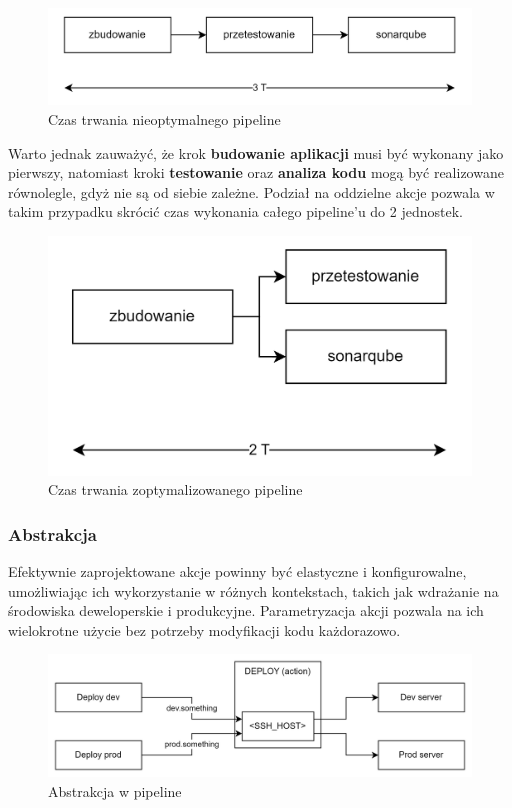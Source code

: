 \documentclass{article}
\begin{document}
\begin{figure}[H]
    \centering
    \includegraphics[width=1\linewidth]{pipelines3T.png}
    \caption{Czas trwania nieoptymalnego pipeline}
    \label{fig:enter-label}
\end{figure}

Warto jednak zauważyć, że krok \textbf{budowanie aplikacji} musi być wykonany jako pierwszy, natomiast kroki \textbf{testowanie} oraz \textbf{analiza kodu} mogą być realizowane równolegle, gdyż nie są od siebie zależne. Podział na oddzielne akcje pozwala w takim przypadku skrócić czas wykonania całego pipeline’u do 2 jednostek.

\begin{figure}[H]
    \centering
    \includegraphics[width=0.5\linewidth]{pipelines2T.png}
    \caption{Czas trwania zoptymalizowanego pipeline}
    \label{fig:enter-label}
\end{figure}

\subsubsection{Abstrakcja}

Efektywnie zaprojektowane akcje powinny być elastyczne i konfigurowalne, umożliwiając ich wykorzystanie w różnych kontekstach, takich jak wdrażanie na środowiska deweloperskie i produkcyjne. Parametryzacja akcji pozwala na ich wielokrotne użycie bez potrzeby modyfikacji kodu każdorazowo.

\begin{figure}[H]
    \centering
    \includegraphics[width=1\linewidth]{pipelinesAbstraction.png}
    \caption{Abstrakcja w pipeline}
    \label{fig:enter-label}
\end{figure}
\end{document}

